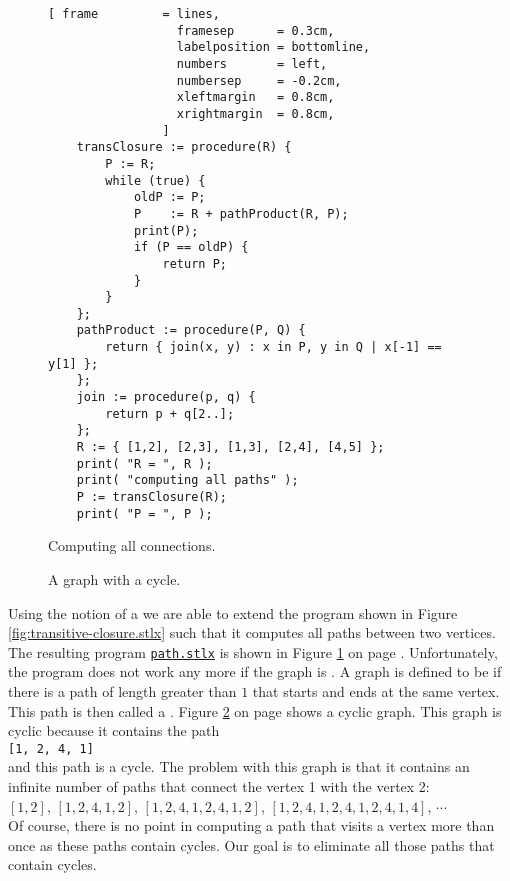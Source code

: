 \begin{figure}[!ht]
  \centering
\begin{Verbatim}[ frame         = lines, 
                  framesep      = 0.3cm, 
                  labelposition = bottomline,
                  numbers       = left,
                  numbersep     = -0.2cm,
                  xleftmargin   = 0.8cm,
                  xrightmargin  = 0.8cm,
                ]
    transClosure := procedure(R) {
        P := R;
        while (true) {
            oldP := P;
            P    := R + pathProduct(R, P);
            print(P);
            if (P == oldP) {
                return P;
            }
        }
    };
    pathProduct := procedure(P, Q) {
        return { join(x, y) : x in P, y in Q | x[-1] == y[1] };
    };    
    join := procedure(p, q) {
        return p + q[2..];
    };
    R := { [1,2], [2,3], [1,3], [2,4], [4,5] };
    print( "R = ", R );
    print( "computing all paths" );
    P := transClosure(R);
    print( "P = ", P );
\end{Verbatim} 
\vspace*{-0.3cm}
\caption{Computing all connections.}  \label{fig:path.stlx}
\end{figure} %

\begin{figure}[!ht]
  \centering
  \vspace*{-9cm}

  \vspace*{-1cm}

  \caption{A graph with a cycle.}
  \label{fig:graph-zykl}
\end{figure}

Using the notion of a  we are able to extend the program shown in Figure
\ref{fig:transitive-closure.stlx} such that it computes all paths between two vertices.
The resulting program
\href{https://github.com/karlstroetmann/Logik/blob/master/SetlX/path.stlx}{\texttt{path.stlx}}
is shown in Figure \ref{fig:path.stlx} on page \pageref{fig:path.stlx}.
Unfortunately, the program does not work any more if the graph is .  A graph is defined
to be  if there is a path of length greater than $1$ that starts and ends at the same
vertex.  This path is then called a .
Figure \ref{fig:graph-zykl} on page \pageref{fig:graph-zykl} shows a cyclic graph.  This graph is
cyclic because it contains the path
\\[0.2cm]
\hspace*{1.3cm}
\texttt{[1, 2, 4, 1]}
\\[0.2cm]
and this path is a cycle.
The problem with this graph is that it contains an infinite number of paths that connect the vertex
1 with the vertex 2: \\[0.2cm]
\hspace*{1.3cm}
$[ 1, 2 ]$, $[ 1, 2, 4, 1, 2 ]$, 
$[ 1, 2, 4, 1, 2, 4, 1, 2 ]$, 
$[ 1, 2, 4, 1, 2, 4, 1, 2, 4, 1, 4 ]$, $\cdots$
\\[0.2cm]
Of course, there is no point in computing a path that visits a vertex more than once as these paths
contain cycles.  Our goal is to eliminate all those paths that contain cycles.



